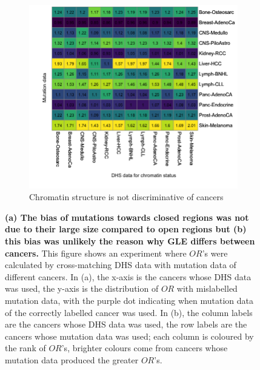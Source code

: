 \begin{figure}[ht!]
    \vspace{0.3cm}
    \begin{subfigure}{\textwidth}
    \centering
    \includegraphics[scale=0.52]{graphics/mixed_or_heatmap.png}
    \caption{Chromatin structure is not discriminative of cancers}
    \label{fig:mixed_or_heatmap}
    \end{subfigure} 
    \caption{\textbf{(a) The bias of mutations towards closed regions was not due to their large size compared to open regions but (b) this bias was unlikely the reason why GLE differs between cancers.} This figure shows an experiment where $OR$'s were calculated by cross-matching DHS data with mutation data of different cancers. In (a), the x-axis is the cancers whose DHS data was used, the y-axis is the distribution of $OR$ with mislabelled mutation data, with the purple dot indicating when mutation data of the correctly labelled cancer was used. In (b), the column labels are the cancers whose DHS data was used, the row labels are the cancers whose mutation data was used; each column is coloured by the rank of $OR$'s, brighter colours come from cancers whose mutation data produced the greater $OR$'s.}
    \label{fig:mixed_or}
\end{figure}